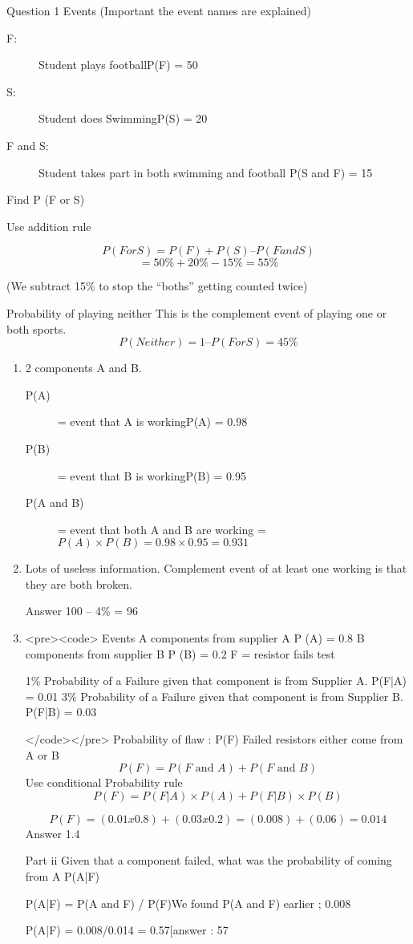 


Question 1
Events  (Important the event names are explained)

\begin{description}
\item[F:] Student plays footballP(F) = 50%
\item[S:] Student does SwimmingP(S) = 20%
\item[F and S:]            Student takes part in both swimming and football  
P(S and F) = 15%
\end{description}
Find P (F or S)

Use addition rule

\[P (F or S)  =  P(F) + P(S) – P( Fand S)\]
\[=  50\% + 20 \% - 15\% =    55\%\]


(We subtract 15\% to stop the “boths” getting counted twice)

Probability of playing neither
This is the complement event of playing one or both sports.
\[P(Neither) = 1 –  P( F or S)  = 45\%\]

\begin{enumerate}
\item 
2 components A and B.
\begin{description}
\item[P(A)] = event that A is workingP(A) = 0.98
\item[P(B)] = event that B is workingP(B) = 0.95
\item[P(A and B)] = event that both A and B are working = $P(A) \times P(B) = 0.98 \times 0.95 = 0.931$
\end{description}

\item 
Lots of useless information.
Complement event of at least one working is that they are both broken.

Answer  100 – 4\% = 96%

\item 


<pre><code>
Events 
A components from supplier A  P (A) = 0.8 
B components from supplier B  P (B) = 0.2 
F = resistor fails test

1\% Probability of a Failure given that component is from Supplier A.      P(F|A) = 0.01
3\% Probability of a Failure given that component is from Supplier B.      P(F|B) = 0.03

</code></pre>
Probability of flaw : P(F)
Failed resistors either come from A or B
\[P( F) =  P ( F \mbox{ and } A)  +  P( F \mbox{ and } B)\]
Use conditional Probability  rule
\[P(F) = P(F|A)\times P(A)  + P(F|B)\times P(B)\]

\[P(F)  =  ( 0.01 x 0.8 ) + ( 0.03 x 0.2) = (0.008) + (0.06) = 0.014\]
Answer 1.4%


Part ii
Given that a component failed, what was the probability of coming from A
P(A|F) 

P(A|F) = P(A and F)  / P(F)We found P(A and F) earlier ; 0.008

P(A|F) = 0.008/0.014 =  0.57[answer : 57%




\end{enumerate}



